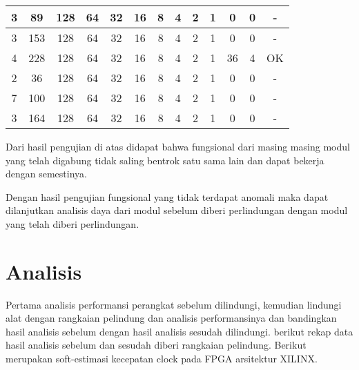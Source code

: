 \begin{table}[H]
\begin{tabular}{|c|c|c|c|c|c|c|c|c|c|c|c|c|}
		\hline
		3     & 89    & 128   & 64    & 32    & 16    & 8     & 4     & 2     & 1     & 0     & 0     & - \bigstrut\\
		\hline
		3     & 153   & 128   & 64    & 32    & 16    & 8     & 4     & 2     & 1     & 0     & 0     & - \bigstrut\\
		\hline
		4     & 228   & 128   & 64    & 32    & 16    & 8     & 4     & 2     & 1     & 36    & 4     & OK \bigstrut\\
		\hline
		2     & 36    & 128   & 64    & 32    & 16    & 8     & 4     & 2     & 1     & 0     & 0     & - \bigstrut\\
		\hline
		7     & 100   & 128   & 64    & 32    & 16    & 8     & 4     & 2     & 1     & 0     & 0     & - \bigstrut\\
		\hline
		3     & 164   & 128   & 64    & 32    & 16    & 8     & 4     & 2     & 1     & 0     & 0     & - \bigstrut\\
		\hline
	\end{tabular}%
\end{table}%

Dari hasil pengujian di atas didapat bahwa fungsional dari masing masing modul yang telah digabung tidak saling bentrok satu sama lain dan dapat bekerja dengan semestinya.

Dengan hasil pengujian fungsional yang tidak terdapat anomali maka dapat dilanjutkan analisis daya dari modul sebelum diberi perlindungan dengan modul yang telah diberi perlindungan.

\section{Analisis}
Pertama analisis performansi perangkat sebelum dilindungi, kemudian lindungi alat dengan rangkaian pelindung dan analisis performansinya dan bandingkan hasil analisis sebelum dengan hasil analisis sesudah dilindungi. berikut rekap data hasil analisis sebelum dan sesudah diberi rangkaian pelindung. Berikut merupakan soft-estimasi kecepatan clock pada FPGA arsitektur XILINX.

